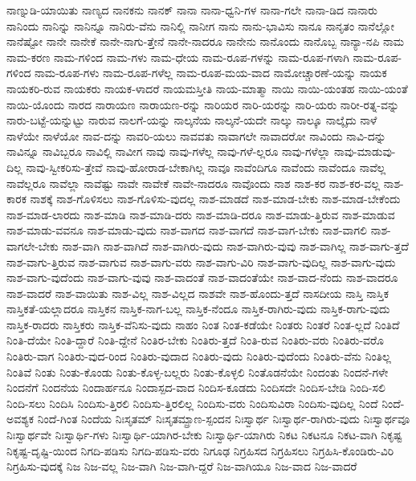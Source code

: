 {ನಾಣ್ನುಡಿ-ಯಾಯಿತು
ನಾಣ್ಯದ
ನಾನಕನು
ನಾನಕ್
ನಾನಾ
ನಾನಾ-ಧ್ವನಿ-ಗಳ
ನಾನಾ-ಗಲೇ
ನಾನಾ-ಡಿದ
ನಾನಾರು
ನಾನಿಂದು
ನಾನಿನ್ನು
ನಾನಿನ್ನೂ
ನಾನಿರು-ವೆನು
ನಾನಿಲ್ಲಿ
ನಾನೀಗ
ನಾನು
ನಾನು-ಭಾವಿಸು
ನಾನೂ
ನಾನೃತಂ
ನಾನೆಲ್ಲೋ
ನಾನೆಷ್ಟೋ
ನಾನೇ
ನಾನೇಕೆ
ನಾನೇ-ನಾಗು-ತ್ತೇನೆ
ನಾನೇ-ನಾದರೂ
ನಾನೇನು
ನಾನೊಂದು
ನಾನೊಬ್ಬ
ನಾನ್ಯಾ-ನಪಿ
ನಾಮ
ನಾಮ-ಕರಣ
ನಾಮ-ಗಳಿಂದ
ನಾಮ-ಗಳು
ನಾಮ-ಧೇಯ
ನಾಮ-ರೂಪ-ಗಳನ್ನು
ನಾಮ-ರೂಪ-ಗಳಾಗಿ
ನಾಮ-ರೂಪ-ಗಳಿಂದ
ನಾಮ-ರೂಪ-ಗಳು
ನಾಮ-ರೂಪ-ಗಳೆಲ್ಲ
ನಾಮ-ರೂಪ-ಮಯ-ವಾದ
ನಾಮೋಚ್ಚಾರಣೆ-ಯನ್ನು
ನಾಯಕ
ನಾಯಕರಿ-ರುವ
ನಾಯಕರು
ನಾಯಕ-ಳಾದರೆ
ನಾಯಮಸ್ತೀತಿ
ನಾಯ-ಮಾತ್ಮಾ
ನಾಯಿ
ನಾಯಿ-ಯಂತಹ
ನಾಯಿ-ಯಂತೆ
ನಾಯಿ-ಯೊಂದು
ನಾರದ
ನಾರಾಯಣ
ನಾರಾಯಣ-ರನ್ನು
ನಾರಿಯರ
ನಾರಿ-ಯರನ್ನು
ನಾರಿ-ಯರು
ನಾರೀ-ರತ್ನ-ವನ್ನು
ನಾರು-ಬಟ್ಟೆ-ಯನ್ನುಟ್ಟು
ನಾರುವ
ನಾಲಗೆ-ಯನ್ನು
ನಾಲ್ಕನೆಯ
ನಾಲ್ಕನೆ-ಯದೇ
ನಾಲ್ಕು
ನಾಲ್ಕೂ
ನಾಲ್ಕೈದು
ನಾಳೆ
ನಾಳೆಯೇ
ನಾಳೆಯೋ
ನಾವ-ದನ್ನು
ನಾವರಿ-ಯಲು
ನಾವವತು
ನಾವಾಗಲೇ
ನಾವಾದರೋ
ನಾವಿಂದು
ನಾವಿ-ದನ್ನು
ನಾವಿನ್ನೂ
ನಾವಿಬ್ಬರೂ
ನಾವಿಲ್ಲಿ
ನಾವೀಗ
ನಾವು
ನಾವು-ಗಳೆಲ್ಲ
ನಾವು-ಗಳೆ-ಲ್ಲರೂ
ನಾವು-ಗಳೆಲ್ಲಾ
ನಾವು-ಮಾಡುವು-ದಿಲ್ಲ
ನಾವು-ಸ್ವೀಕರಿಸು-ತ್ತೇವೆ
ನಾವು-ಹೋರಾಡ-ಬೇಕಾಗಿಲ್ಲ
ನಾವೂ
ನಾವೆಂದಿಗೂ
ನಾವೆಂದು
ನಾವೆಂದೂ
ನಾವೆಲ್ಲ
ನಾವೆಲ್ಲರೂ
ನಾವೆಲ್ಲಾ
ನಾವೆಷ್ಟು
ನಾವೇ
ನಾವೇಕೆ
ನಾವೇ-ನಾದರೂ
ನಾವೊಂದು
ನಾಶ
ನಾಶ-ಕರ
ನಾಶ-ಕರ-ವಲ್ಲ
ನಾಶ-ಕಾರಕ
ನಾಶಕ್ಕೆ
ನಾಶ-ಗೊಳಿಸಲು
ನಾಶ-ಗೊಳಿಸು-ವುದಲ್ಲ
ನಾಶ-ಮಾಡದೆ
ನಾಶ-ಮಾಡ-ಬೇಕು
ನಾಶ-ಮಾಡ-ಬೇಕೆಂದು
ನಾಶ-ಮಾಡ-ಲಾರದು
ನಾಶ-ಮಾಡಿ
ನಾಶ-ಮಾಡಿ-ದರು
ನಾಶ-ಮಾಡಿ-ದರೂ
ನಾಶ-ಮಾಡು-ತ್ತಿರುವ
ನಾಶ-ಮಾಡುವ
ನಾಶ-ಮಾಡು-ವವನೂ
ನಾಶ-ಮಾಡು-ವುದು
ನಾಶ-ವಾಗದ
ನಾಶ-ವಾಗದೆ
ನಾಶ-ವಾಗ-ಬೇಕು
ನಾಶ-ವಾಗಲಿ
ನಾಶ-ವಾಗಲೇ-ಬೇಕು
ನಾಶ-ವಾಗಿ
ನಾಶ-ವಾಗಿದೆ
ನಾಶ-ವಾಗಿರು-ವುದು
ನಾಶ-ವಾಗಿರು-ವುವು
ನಾಶ-ವಾಗಿಲ್ಲ
ನಾಶ-ವಾಗು-ತ್ತದೆ
ನಾಶ-ವಾಗು-ತ್ತಿರುವ
ನಾಶ-ವಾಗುವ
ನಾಶ-ವಾಗು-ವರು
ನಾಶ-ವಾಗು-ವಿರಿ
ನಾಶ-ವಾಗು-ವುದಿಲ್ಲ
ನಾಶ-ವಾಗು-ವುದು
ನಾಶ-ವಾಗು-ವುದೆಂದು
ನಾಶ-ವಾಗು-ವುವು
ನಾಶ-ವಾದಂತೆ
ನಾಶ-ವಾದಂತೆಯೇ
ನಾಶ-ವಾದ-ನೆಂದು
ನಾಶ-ವಾದರೂ
ನಾಶ-ವಾದರೆ
ನಾಶ-ವಾಯಿತು
ನಾಶ-ವಿಲ್ಲ
ನಾಶ-ವಿಲ್ಲದ
ನಾಶವೇ
ನಾಶ-ಹೊಂದು-ತ್ತದೆ
ನಾಸದೀಯ
ನಾಸ್ತಿ
ನಾಸ್ತಿಕ
ನಾಸ್ತಿಕತೆ-ಯಲ್ಲಾದರೂ
ನಾಸ್ತಿಕನ
ನಾಸ್ತಿಕ-ನಾಗ-ಬಲ್ಲ
ನಾಸ್ತಿಕ-ನೆಂದೂ
ನಾಸ್ತಿಕ-ರಾಗಿರು-ವುದು
ನಾಸ್ತಿಕ-ರಾಗು-ವುದು
ನಾಸ್ತಿಕ-ರಾದರು
ನಾಸ್ತಿಕರು
ನಾಸ್ತಿಕ-ವೆನಿಸು-ವುದು
ನಾಹಂ
ನಿಂತ
ನಿಂತ-ಕಡೆಯೇ
ನಿಂತರು
ನಿಂತರೆ
ನಿಂತ-ಲ್ಲದೆ
ನಿಂತಿದೆ
ನಿಂತಿ-ದೆಯೇ
ನಿಂತಿ-ದ್ದಾರೆ
ನಿಂತಿ-ದ್ದೇನೆ
ನಿಂತಿರ-ಬೇಕು
ನಿಂತಿರು-ತ್ತದೆ
ನಿಂತಿ-ರುವ
ನಿಂತಿರು-ವರು
ನಿಂತಿರು-ವರೊ
ನಿಂತಿರು-ವಾಗ
ನಿಂತಿರು-ವುದ-ರಿಂದ
ನಿಂತಿರು-ವುದಾದ
ನಿಂತಿರು-ವುದು
ನಿಂತಿರು-ವುದೆಂದು
ನಿಂತಿರು-ವೆನು
ನಿಂತಿಲ್ಲ
ನಿಂತಿವೆ
ನಿಂತು
ನಿಂತು-ಕೊಂಡು
ನಿಂತು-ಕೊಳ್ಳ-ಬಲ್ಲರು
ನಿಂತು-ಕೊಳ್ಳಲಿ
ನಿಂತೊಡನೆಯೇ
ನಿಂದಂತು
ನಿಂದನೆ-ಗಳೇ
ನಿಂದನೆಗೆ
ನಿಂದನೆಯ
ನಿಂದಾರ್ಹನೂ
ನಿಂದಾಸ್ಪದ-ವಾದ
ನಿಂದಿಸ-ಕೂಡದು
ನಿಂದಿಸದೇ
ನಿಂದಿಸ-ಬೇಡಿ
ನಿಂದಿ-ಸಲಿ
ನಿಂದಿ-ಸಲು
ನಿಂದಿಸಿ
ನಿಂದಿಸು-ತ್ತಿರಲಿ
ನಿಂದಿಸು-ತ್ತಿರಲಿಲ್ಲ
ನಿಂದಿಸು-ವರು
ನಿಂದಿಸುವಿರಾ
ನಿಂದಿಸು-ವುದಿಲ್ಲ
ನಿಂದೆ
ನಿಂದೆ-ಅವಶ್ಯಕ
ನಿಂದೆ-ಗಿಂತ
ನಿಂದೆಯ
ನಿಃಸೃತಮ್
ನಿಃಸೃತಮ್ಪ್ರಾಣ-ಸ್ಪಂದನ
ನಿಃಸ್ವಾರ್ಥ
ನಿಃಸ್ವಾರ್ಥ-ರಾಗಿರು-ವುದು
ನಿಃಸ್ವಾರ್ಥವೂ
ನಿಃಸ್ವಾರ್ಥವೇ
ನಿಃಸ್ವಾರ್ಥಿ-ಗಳು
ನಿಃಸ್ವಾರ್ಥಿ-ಯಾಗಿರ-ಬೇಕು
ನಿಃಸ್ವಾರ್ಥಿ-ಯಾಗಿರು
ನಿಕಟ
ನಿಕಟನೂ
ನಿಕಟ-ವಾಗಿ
ನಿಕೃಷ್ಟ
ನಿಕೃಷ್ಟ-ದೃಷ್ಟಿ-ಯಿಂದ
ನಿಗದಿ-ಪಡಿಸು
ನಿಗದಿ-ಪಡಿಸು-ವರು
ನಿಗೂಢ
ನಿಗ್ರಹಿಸದ
ನಿಗ್ರಹಿಸಲು
ನಿಗ್ರಹಿಸಿ-ಕೊಂಡಿರು-ವಿರಿ
ನಿಗ್ರಹಿಸು-ವುದಕ್ಕೆ
ನಿಜ
ನಿಜ-ವಲ್ಲ
ನಿಜ-ವಾಗಿ
ನಿಜ-ವಾಗಿ-ದ್ದರೆ
ನಿಜ-ವಾಗಿಯೂ
ನಿಜ-ವಾದ
ನಿಜ-ವಾದರೆ
}
